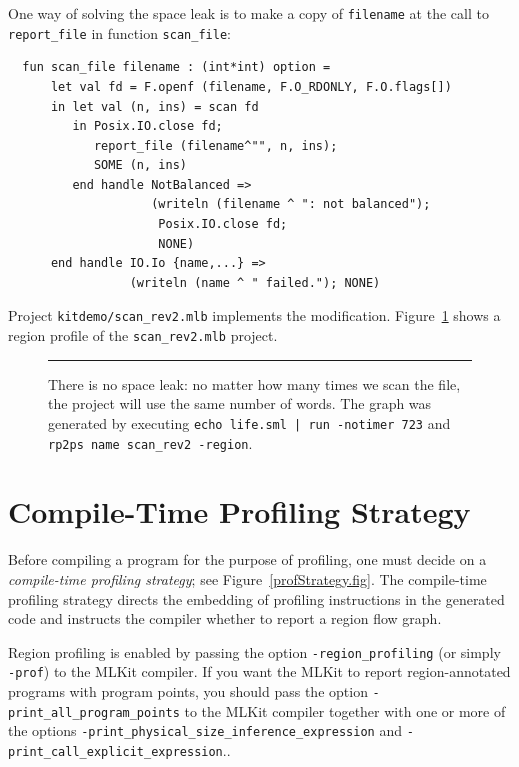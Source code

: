 \documentclass[12pt]{book}
\begin{document}
One way of solving the space leak is to make a copy of {\tt filename}
at the call to {\tt report\_file} in function {\tt scan\_file}:
\begin{verbatim}
  fun scan_file filename : (int*int) option =
      let val fd = F.openf (filename, F.O_RDONLY, F.O.flags[])
      in let val (n, ins) = scan fd
         in Posix.IO.close fd;
            report_file (filename^"", n, ins);
            SOME (n, ins)
         end handle NotBalanced =>
                    (writeln (filename ^ ": not balanced");
                     Posix.IO.close fd;
                     NONE)
      end handle IO.Io {name,...} =>
                 (writeln (name ^ " failed."); NONE)
\end{verbatim}
Project
%
{\tt kitdemo/scan\_rev2.mlb} implements the modification.
Figure~\ref{scan_rev2_1.fig} shows a region profile of the
\texttt{scan\_rev2.mlb} project.
\begin{figure}
\caption{There is no space leak: no matter how many times we scan the
  file, the project will use the same number of words. The graph was
  generated by executing \texttt{echo life.sml | run -notimer 723} and
  \texttt{rp2ps name scan\_rev2 -region}.}
\label{scan_rev2_1.fig}
\medskip\hrule
\end{figure}

\section{Compile-Time Profiling Strategy}

Before compiling a program for the purpose of profiling, one must decide on a
%
{\em compile-time profiling strategy}; see
Figure~\ref{profStrategy.fig}.  The compile-time profiling strategy
directs the embedding of profiling instructions in the generated code
and instructs the compiler whether to report a region flow graph.

Region profiling is enabled by passing the option
%
\texttt{-region\_profiling} (or simply \texttt{-prof}) to the MLKit
compiler. If you want the MLKit to report region-annotated programs
with program points, you should pass the option
%
\texttt{-print\_all\_program\_points}
to the MLKit compiler together with one or more of the options
%
\texttt{-print\_physical\_size\_inference\_expression} and
%
\texttt{-print\_call\_explicit\_expression}..
\end{document}
